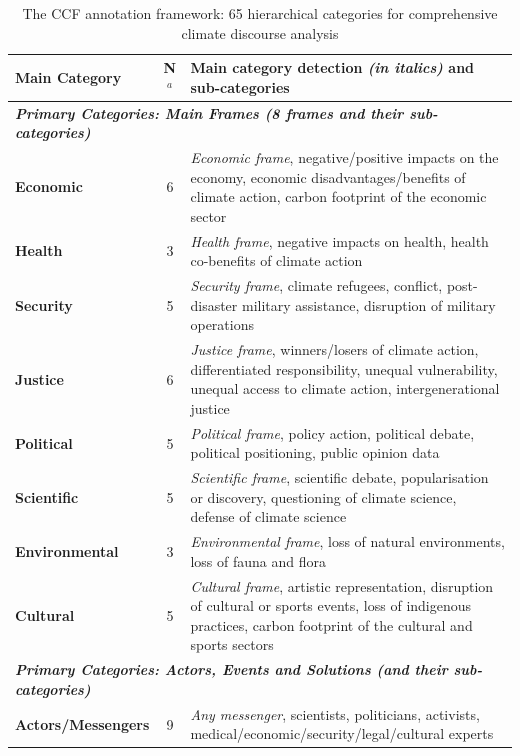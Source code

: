 \documentclass[12pt]{article}
\renewcommand\_{\texttt{\detokenize{_}\allowbreak}}
\begin{document}
\begin{table}[b!]
\centering
\caption{The CCF annotation framework: 65 hierarchical categories for comprehensive climate discourse analysis}
\label{tab:framework_summary}
\footnotesize
\begin{tabularx}{\textwidth}{lcX}
\toprule
\rowcolor{gray!15}
\textbf{Main Category} & \textbf{N}$^a$ & \textbf{Main category detection \textit{(in italics)} and sub-categories} \\
\midrule
\multicolumn{3}{l}{\cellcolor{gray!10}\textbf{\textit{Primary Categories: Main Frames (8 frames and their sub-categories)}}} \\
\midrule
\textbf{Economic}      & 6 & \textit{Economic frame}, negative/positive impacts on the economy, economic disadvantages/benefits of climate action, carbon footprint of the economic sector \\
\textbf{Health}        & 3 & \textit{Health frame}, negative impacts on health, health co-benefits of climate action \\
\textbf{Security}      & 5 & \textit{Security frame}, climate refugees, conflict, post-disaster military assistance, disruption of military operations \\
\textbf{Justice}       & 6 & \textit{Justice frame}, winners/losers of climate action, differentiated responsibility, unequal vulnerability, unequal access to climate action, intergenerational justice \\
\textbf{Political}     & 5 & \textit{Political frame}, policy action, political debate, political positioning, public opinion data \\
\textbf{Scientific}    & 5 & \textit{Scientific frame}, scientific debate, popularisation or discovery, questioning of climate science, defense of climate science \\
\textbf{Environmental} & 3 & \textit{Environmental frame}, loss of natural environments, loss of fauna and flora \\
\textbf{Cultural}      & 5 & \textit{Cultural frame}, artistic representation, disruption of cultural or sports events, loss of indigenous practices, carbon footprint of the cultural and sports sectors \\
\midrule
\multicolumn{3}{l}{\cellcolor{gray!10}\textbf{\textit{Primary Categories: Actors, Events and Solutions (and their sub-categories)}}} \\
\midrule
\textbf{Actors/Messengers} & 9 & \textit{Any messenger}, scientists, politicians, activists, medical/economic/security/legal/cultural experts \\

\end{tabularx}
\end{table}
\end{document}
